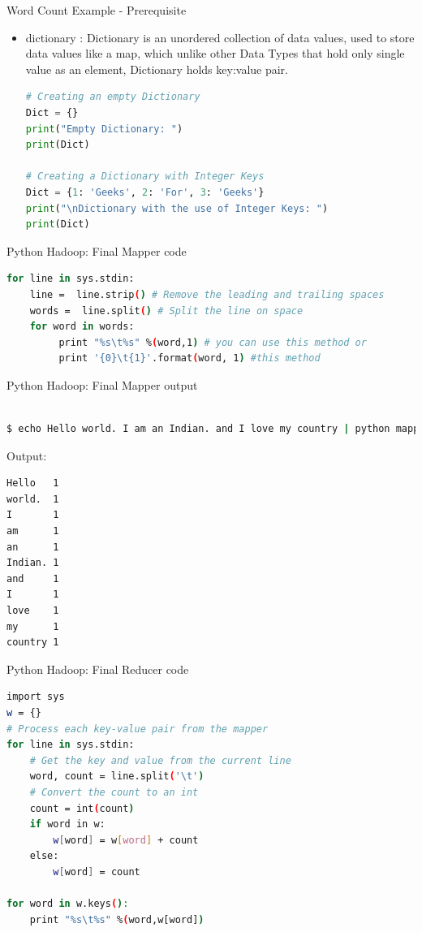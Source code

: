 \documentclass[pdf]{beamer}
\begin{document}
\begin{frame}[fragile]{Word Count Example - Prerequisite}
\begin{itemize}
	\item dictionary : Dictionary is an unordered collection of data values, used to store data values like a map, which unlike other Data Types that hold only single value as an element, Dictionary holds key:value pair. 
\begin{lstlisting}[language=python]
# Creating an empty Dictionary 
Dict = {} 
print("Empty Dictionary: ") 
print(Dict) 
  
# Creating a Dictionary with Integer Keys 
Dict = {1: 'Geeks', 2: 'For', 3: 'Geeks'} 
print("\nDictionary with the use of Integer Keys: ") 
print(Dict) 

\end{lstlisting}
\end{itemize}		
\end{frame}



\begin{frame}[fragile]{Python Hadoop: Final Mapper code}
\begin{lstlisting}[language=bash]
for line in sys.stdin:
    line =  line.strip() # Remove the leading and trailing spaces
    words =  line.split() # Split the line on space
    for word in words:
         print "%s\t%s" %(word,1) # you can use this method or
         print '{0}\t{1}'.format(word, 1) #this method
\end{lstlisting}
\end{frame}

\begin{frame}[fragile]{Python Hadoop: Final Mapper output}
\begin{lstlisting}[language=bash]

$ echo Hello world. I am an Indian. and I love my country | python mapper.py 

\end{lstlisting}
Output:
\begin{lstlisting}[language=bash]
Hello   1
world.  1
I       1
am      1
an      1
Indian. 1
and     1
I       1
love    1
my      1
country 1
\end{lstlisting}
\end{frame}

\begin{frame}[fragile]{Python Hadoop: Final Reducer code}
\begin{lstlisting}[language=bash]
import sys
w = {}
# Process each key-value pair from the mapper
for line in sys.stdin:
    # Get the key and value from the current line
    word, count = line.split('\t')
    # Convert the count to an int
    count = int(count)
    if word in w:
        w[word] = w[word] + count
    else:
        w[word] = count

for word in w.keys():
    print "%s\t%s" %(word,w[word])
\end{lstlisting}
\end{frame}
\end{document}
